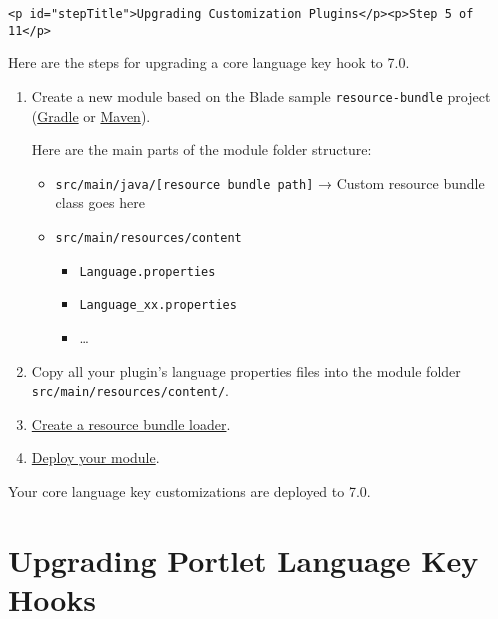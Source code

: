 \begin{verbatim}
<p id="stepTitle">Upgrading Customization Plugins</p><p>Step 5 of 11</p>
\end{verbatim}

Here are the steps for upgrading a core language key hook to 7.0.

\begin{enumerate}
\def\labelenumi{\arabic{enumi}.}
\item
  Create a new module based on the Blade sample \texttt{resource-bundle}
  project
  (\href{https://github.com/liferay/liferay-blade-samples/tree/master/gradle/extensions/resource-bundle}{Gradle}
  or
  \href{https://github.com/liferay/liferay-blade-samples/tree/master/maven/extensions/resource-bundle}{Maven}).

  Here are the main parts of the module folder structure:

  \begin{itemize}
  \tightlist
  \item
    \texttt{src/main/java/{[}resource\ bundle\ path{]}} → Custom
    resource bundle class goes here
  \item
    \texttt{src/main/resources/content}

    \begin{itemize}
    \tightlist
    \item
      \texttt{Language.properties}
    \item
      \texttt{Language\_xx.properties}
    \item
      \ldots{}
    \end{itemize}
  \end{itemize}
\item
  Copy all your plugin's language properties files into the module
  folder \texttt{src/main/resources/content/}.
\item
  \href{/docs/7-2/customization/-/knowledge_base/c/overriding-global-language-keys\#create-a-resource-bundle-service-component}{Create
  a resource bundle loader}.
\item
  \href{/docs/7-2/reference/-/knowledge_base/r/deploying-a-project}{Deploy
  your module}.
\end{enumerate}

Your core language key customizations are deployed to 7.0.

\chapter{Upgrading Portlet Language Key
Hooks}\label{upgrading-portlet-language-key-hooks}

